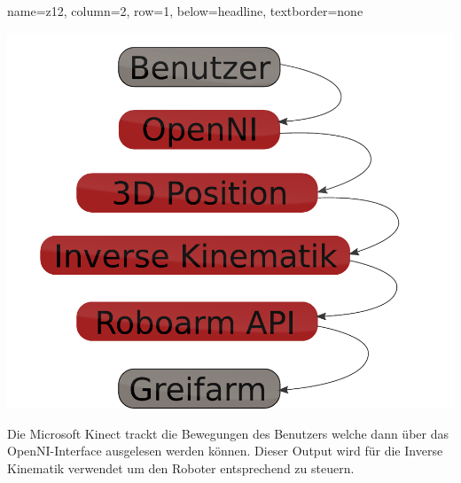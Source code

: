 \documentclass[portrait,a0paper]{baposter}
\begin{document}
\begin{poster}
    {
    name=z12,
    column=2,
    row=1,
    below=headline,
    textborder=none
    }
    {

\includegraphics[width=\textwidth]{imgs/komponenten.pdf}

Die Microsoft Kinect trackt die Bewegungen des Benutzers welche dann über das OpenNI-Interface ausgelesen werden können. Dieser Output wird für die Inverse Kinematik verwendet um den Roboter entsprechend zu steuern.
 }
 
%



\end{poster}
\end{document}
